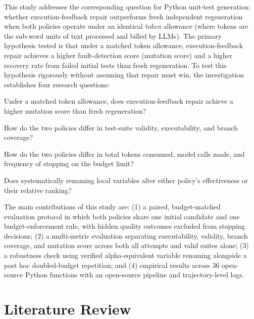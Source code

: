 \documentclass[11pt,a4paper]{article}
\begin{document}
This study addresses the corresponding question for Python unit-test generation: whether execution-feedback repair outperforms fresh independent regeneration when both policies operate under an identical \emph{token} allowance (where tokens are the sub-word units of text processed and billed by LLMs). The primary hypothesis tested is that under a matched token allowance, execution-feedback repair achieves a higher fault-detection score (mutation score) and a higher recovery rate from failed initial tests than fresh regeneration. To test this hypothesis rigorously without assuming that repair must win, the investigation establishes four research questions:
\begin{description}[leftmargin=*,nosep]
  \item[RQ1] Under a matched token allowance, does execution-feedback repair achieve a higher mutation score than fresh regeneration?
  \item[RQ2] How do the two policies differ in test-suite validity, executability, and branch coverage?
  \item[RQ3] How do the two policies differ in total tokens consumed, model calls made, and frequency of stopping on the budget limit?
  \item[RQ4] Does systematically renaming local variables alter either policy's effectiveness or their relative ranking?
\end{description}

The main contributions of this study are: (1) a paired, budget-matched evaluation protocol in which both policies share one initial candidate and one budget-enforcement rule, with hidden quality outcomes excluded from stopping decisions; (2) a multi-metric evaluation separating executability, validity, branch coverage, and mutation score across both all attempts and valid suites alone; (3) a robustness check using verified alpha-equivalent variable renaming alongside a post hoc doubled-budget repetition; and (4) empirical results across 36 open-source Python functions with an open-source pipeline and trajectory-level logs.

\section{Literature Review}
\end{document}
